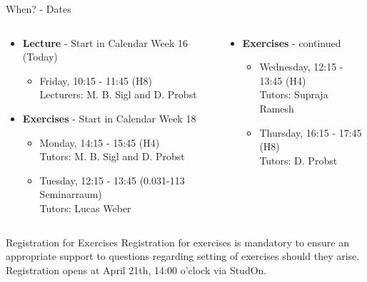 \begin{frame}{When? - Dates}
	\begin{columns}
		\begin{column}{0.5\textwidth}
			\begin{itemize}
				\item \textbf{Lecture} - Start in Calendar Week 16 (Today)
				      \begin{itemize}
					      \item Friday, 10:15 - 11:45 (H8) \\
					            {\color{gray}Lecturers: M. B. Sigl and D. Probst}
				      \end{itemize}
				\item \textbf{Exercises} - Start in Calendar Week 18
				      \begin{itemize}
					      \item Monday, 14:15 - 15:45 (H4) \\
					            {\color{gray}Tutors: M. B. Sigl and D. Probst}
					      \item Tuesday, 12:15 - 13:45 (0.031-113 Seminarraum) \\
					            {\color{gray}Tutors: Lucas Weber}
				      \end{itemize}
			\end{itemize}
		\end{column}

		\begin{column}{0.5\textwidth}
			\begin{itemize}
				\item \textbf{Exercises} - continued
				      \begin{itemize}
					      \item Wednesday, 	12:15 - 13:45 (H4) \\
					            {\color{gray}Tutors: Supraja Ramesh}
					      \item Thursday, 16:15 - 17:45 (H8) \\
					            {\color{gray}Tutors: D. Probst}
				      \end{itemize}
			\end{itemize}
		\end{column}
	\end{columns}

	\begin{block}{Registration for Exercises}
		Registration for exercises is mandatory to ensure an appropriate support to questions regarding setting of exercises should they arise.
			{\color{faured}Registration opens at April 21th, 14:00 o'clock via StudOn.}
	\end{block}
\end{frame}

